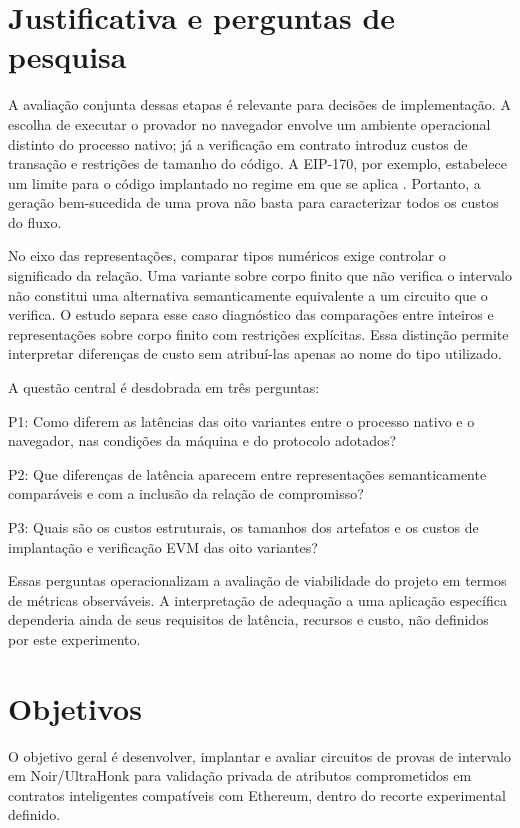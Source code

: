 \section{Justificativa e perguntas de pesquisa}

A avaliação conjunta dessas etapas é relevante para decisões de implementação. A escolha de executar o provador no navegador envolve um ambiente operacional distinto do processo nativo; já a verificação em contrato introduz custos de transação e restrições de tamanho do código. A EIP-170, por exemplo, estabelece um limite para o código implantado no regime em que se aplica \cite{eip170}. Portanto, a geração bem-sucedida de uma prova não basta para caracterizar todos os custos do fluxo.

No eixo das representações, comparar tipos numéricos exige controlar o significado da relação. Uma variante sobre corpo finito que não verifica o intervalo não constitui uma alternativa semanticamente equivalente a um circuito que o verifica. O estudo separa esse caso diagnóstico das comparações entre inteiros e representações sobre corpo finito com restrições explícitas. Essa distinção permite interpretar diferenças de custo sem atribuí-las apenas ao nome do tipo utilizado.

A questão central é desdobrada em três perguntas:

\noindent P1: Como diferem as latências das oito variantes entre o processo nativo e o navegador, nas condições da máquina e do protocolo adotados?

\noindent P2: Que diferenças de latência aparecem entre representações semanticamente comparáveis e com a inclusão da relação de compromisso?

\noindent P3: Quais são os custos estruturais, os tamanhos dos artefatos e os custos de implantação e verificação EVM das oito variantes?

Essas perguntas operacionalizam a avaliação de viabilidade do projeto em termos de métricas observáveis. A interpretação de adequação a uma aplicação específica dependeria ainda de seus requisitos de latência, recursos e custo, não definidos por este experimento.

\section{Objetivos}

O objetivo geral é desenvolver, implantar e avaliar circuitos de provas de intervalo em Noir/UltraHonk para validação privada de atributos comprometidos em contratos inteligentes compatíveis com Ethereum, dentro do recorte experimental definido.


